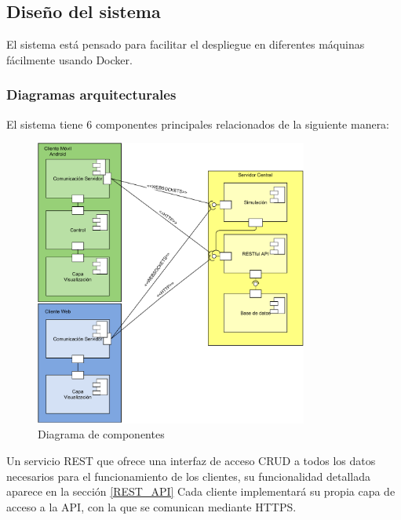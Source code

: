 \documentclass{article}
\begin{document}
\subsection{Diseño del sistema}


El sistema está pensado para facilitar el despliegue en diferentes máquinas
fácilmente usando Docker.

\subsubsection{Diagramas arquitecturales}

El sistema tiene 6 componentes principales relacionados de la siguiente manera:
\begin{figure}[htb]
    \centering
    \includegraphics[width=0.8\textwidth]{../images/componentes_despliegue.pdf}
    \caption{Diagrama de componentes}
    \label{fig:diag_componentes}
\end{figure}

Un servicio REST que ofrece una interfaz de acceso CRUD a todos los datos necesarios para
el funcionamiento de los clientes, su funcionalidad detallada aparece en la sección \ref{REST_API}
Cada cliente implementará su propia capa de acceso a la API, con la que se comunican mediante
HTTPS.
\end{document}
